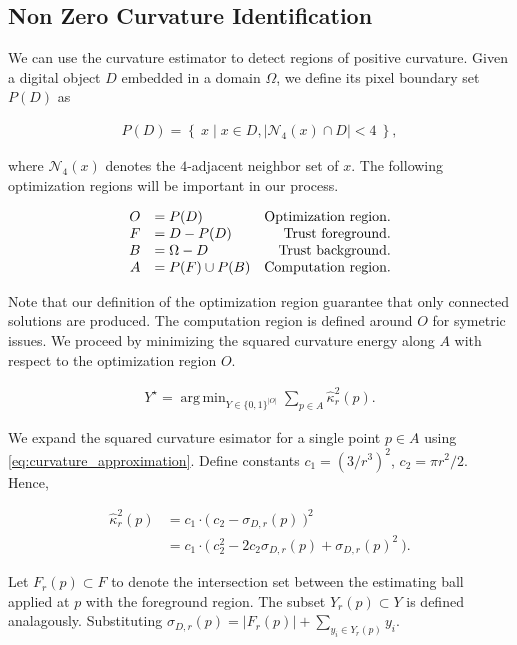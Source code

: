 \documentclass[runningheads]{llncs}
\DeclareMathOperator*{\argmin}{arg\,min}
\begin{document}
\subsection{Non Zero Curvature Identification}

We can use the curvature estimator to detect regions of positive curvature. Given a digital object $D$ embedded in a domain $\Omega$, we define its pixel boundary set $P(D)$ as

\begin{align*}
	P(D) = \left\{ \: x \; | \; x \in D, |\mathcal{N}_4(x) \cap D|<4 \: \right\},
\end{align*}

where $\mathcal{N}_4(x)$ denotes the $4$-adjacent neighbor set of $x$. The following optimization regions will be important in our process.

\[\arraycolsep=5pt
\begin{array}{rlr}
	O &= P(D) & \text{Optimization region.} \\
	F &= D - P(D) & \text{Trust foreground.} \\
	B &= \Omega - D & \text{Trust background.} \\
	A &= P(F) \cup P(B) & \text{Computation region}.
\end{array}
\]

Note that our definition of the optimization region guarantee that only connected solutions are produced. The computation region is defined around $O$ for symetric issues. We proceed by minimizing the squared curvature energy along $A$ with respect to the optimization region $O$. 

\begin{align}			
	Y^{\star} = \argmin_{Y \in \{0,1\}^{|O|}} \sum_{p \in A}{\hat{\kappa}_{r}^2(p)}.
	\label{eq:curvature_highlighting_opt_problem}
\end{align}

We expand the squared curvature esimator for a single point $p \in A$ using \eqref{eq:curvature_approximation}. Define constants $c_1 = (3/r^3)^2$, $c_2=\pi r^2/2$. Hence,

\begin{align*}
\hat{\kappa}_{r}^2(p) &= c_1 \cdot \big(\: c_2 - \sigma_{D,r}(p) \: \big)^2 \\
&= c_1 \cdot \big(\: c_2^2 - 2c_2\sigma_{D,r}(p) + \sigma_{D,r}(p)^2 \: \big).
\end{align*}

Let $F_r(p) \subset F$ to denote the intersection set between the estimating ball applied at $p$ with the foreground region. The subset $Y_r(p) \subset Y$ is defined  analagously. Substituting $\sigma_{D,r}(p) = |F_r(p)| + \sum_{y_i \in Y_r(p)}{y_i}$.
\end{document}
